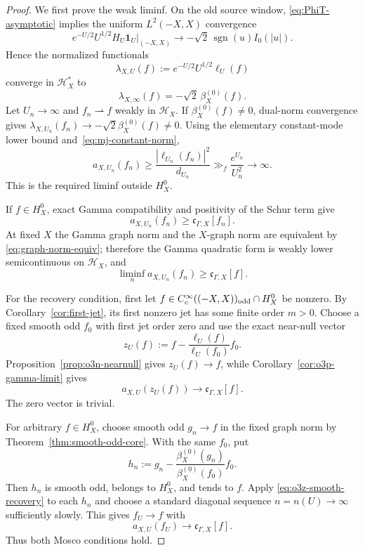 \begin{proof}
We first prove the weak liminf.  On the old source window,
\eqref{eq:PhiT-asymptotic} implies the uniform $L^2(-X,X)$ convergence
\[
 e^{-U/2}U^{1/2}H_U\mathbf1_U|_{(-X,X)}
 \longrightarrow
 -\sqrt2\,\operatorname{sgn}(u)I_0(|u|).
\tag{O3Z.2}\label{eq:o3z-boundary-functional}
\]
Hence the normalized functionals
\[
 \lambda_{X,U}(f):=e^{-U/2}U^{1/2}\ell_U(f)
\]
converge in $\mathcal H_X^*$ to
\[
 \lambda_{X,\infty}(f)=-\sqrt2\,\beta_X^{(0)}(f).
\tag{O3Z.3}\label{eq:o3z-functional-limit}
\]
Let $U_n\to\infty$ and $f_n\rightharpoonup f$ weakly in $\mathcal H_X$.
If $\beta_X^{(0)}(f)\ne0$, dual-norm convergence gives
$\lambda_{X,U_n}(f_n)\to-\sqrt2\beta_X^{(0)}(f)\ne0$.  Using the elementary
constant-mode lower bound and~\eqref{eq:mj-constant-norm},
\[
 a_{X,U_n}(f_n)
 \ge\frac{|\ell_{U_n}(f_n)|^2}{d_{U_n}}
 \gg_f\frac{e^{U_n}}{U_n^2}\longrightarrow\infty.
\tag{O3Z.4}\label{eq:o3z-outside-divergence}
\]
This is the required liminf outside $H_X^0$.

If $f\in H_X^0$, exact Gamma compatibility and positivity of the Schur term give
\[
 a_{X,U_n}(f_n)\ge\mathfrak c_{\Gamma,X}[f_n].
\]
At fixed $X$ the Gamma graph norm and the $X$-graph norm are equivalent by
\eqref{eq:graph-norm-equiv}; therefore the Gamma quadratic form is weakly lower
semicontinuous on $\mathcal H_X$, and
\[
 \liminf_n a_{X,U_n}(f_n)
 \ge\mathfrak c_{\Gamma,X}[f].
\]

For the recovery condition, first let
$f\in C_c^\infty((-X,X))_{\rm odd}\cap H_X^0$ be nonzero.  By
Corollary~\ref{cor:first-jet}, its first nonzero jet has some finite order $m>0$.
Choose a fixed smooth odd $f_0$ with first jet order zero and use the exact near-null
vector
\[
 z_U(f)
 :=f-\frac{\ell_U(f)}{\ell_U(f_0)}f_0.
\]
Proposition~\ref{prop:o3n-nearnull} gives $z_U(f)\to f$, while
Corollary~\ref{cor:o3p-gamma-limit} gives
\[
 a_{X,U}(z_U(f))\longrightarrow\mathfrak c_{\Gamma,X}[f].
\tag{O3Z.5}\label{eq:o3z-smooth-recovery}
\]
The zero vector is trivial.

For arbitrary $f\in H_X^0$, choose smooth odd $g_n\to f$ in the fixed graph norm by
Theorem~\ref{thm:smooth-odd-core}.  With the same $f_0$, put
\[
 h_n:=g_n-
 \frac{\beta_X^{(0)}(g_n)}{\beta_X^{(0)}(f_0)}f_0.
\]
Then $h_n$ is smooth odd, belongs to $H_X^0$, and tends to $f$.  Apply
\eqref{eq:o3z-smooth-recovery} to each $h_n$ and choose a standard diagonal sequence
$n=n(U)\to\infty$ sufficiently slowly.  This gives $f_U\to f$ with
\[
 a_{X,U}(f_U)\to\mathfrak c_{\Gamma,X}[f].
\]
Thus both Mosco conditions hold.
\end{proof}

